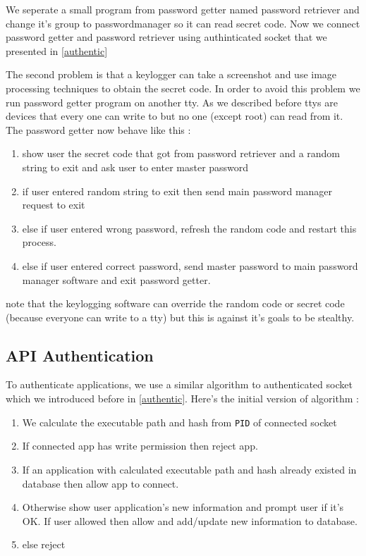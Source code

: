\documentclass[journal]{IEEEtran}
\begin{document}
We seperate a small program from password getter named password retriever and change it's group to passwordmanager so it can read secret code. Now we connect password getter and password retriever using authinticated socket that we presented in \ref{authentic}


The second problem is that a keylogger can take a screenshot and use image processing techniques to obtain the secret code. In order to avoid this problem we run password getter program on 
another tty. As we described before ttys are devices that every one can write to but no one (except root) can read from it. The password getter now behave like this :

\begin{enumerate}
\item show user the secret code that got from password retriever and a random string to exit and ask user to enter master password
\item if user entered random string to exit then send main password manager request to exit
\item else if user entered wrong password, refresh the random code and restart this process.
\item else if user entered correct password, send master password to main password manager software and exit password getter.
\end{enumerate}

note that the keylogging software can override the random code or secret code (because everyone can write to a tty) but this is against it's goals to be stealthy.

\subsection{API Authentication} 

To authenticate applications, we use a similar algorithm to authenticated socket which we introduced before in \ref{authentic}. Here's the initial version of algorithm :

\begin{enumerate}

\item We calculate the executable path and hash from \texttt{PID} of connected socket
\item If connected app has write permission then reject app.
\item If an application with calculated executable path and hash already existed in database then allow app to connect.
\item Otherwise show user application's new information and prompt user if it's OK. If user allowed then allow and add/update new information to database.
\item else reject

\end{enumerate}
\end{document}

